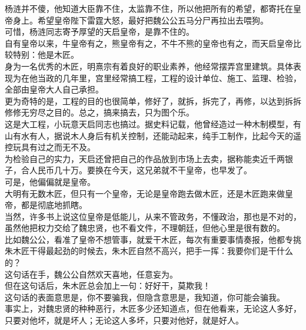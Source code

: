 \begin{multicols}{\theparacolNo}
杨涟并不傻，他知道大臣靠不住，太监靠不住，所以他把所有的希望，都寄托在皇帝身上。希望皇帝陛下雷霆大怒，最好把魏公公五马分尸再拉出去喂狗。\\

可惜，杨涟同志寄予厚望的天启皇帝，是靠不住的。\\

自有皇帝以来，牛皇帝有之，熊皇帝有之，不牛不熊的皇帝也有之，而天启皇帝比较特别：他是木匠。\\

身为一名优秀的木匠，明熹宗有着良好的职业素养，他经常摆弄宫里建筑。具体表现为在他当政的几年里，宫里经常搞工程，工程的设计单位、施工、监理、检验，全部由皇帝大人自己承担。\\

更为奇特的是，工程的目的也很简单，修好了，就拆，拆完了，再修，以达到拆拆修修无穷尽之目的。总之，搞来搞去，只为图个乐。\\

这是大工程，小玩意天启同志也搞过。据史料记载，他曾经造过一种木制模型，有山有水有人，据说木人身后有机关控制，还能动起来，纯手工制作，比起今天的遥控玩具有过之而无不及。\\

为检验自己的实力，天启还曾把自己的作品放到市场上去卖，据称能卖近千两银子，合人民币几十万。要换在今天，这兄弟就不干皇帝，也早发了。\\

可是，他偏偏就是皇帝。\\

大明有无数木匠，但只有一个皇帝，无论是皇帝跑去做木匠，还是木匠跑来做皇帝，都是彻底地抓瞎。\\

当然，许多书上说这位皇帝是低能儿，从来不管政务，不懂政治，那也是不对的，虽然他把权力交给了魏忠贤，也不看文件，不理朝廷，但他心里是很有数的。\\

比如魏公公，看准了皇帝不想管事，就爱干木匠，每次有重要事情奏报，他都专挑朱木匠干得最起劲的时候去，朱木匠自然不高兴，把手一挥：我要你们是干什么的？\\

这句话在手，魏公公自然欢天喜地，任意妄为。\\

但在这句话后，朱木匠总会加上一句：好好干，莫欺我！\\

这句话的表面意思是，你不要骗我，但隐含意思是，我知道，你可能会骗我。\\

事实上，对魏忠贤的种种恶行，木匠多少还知道点，但在他看来，无论这人多好，只要对他坏，就是坏人；无论这人多坏，只要对他好，就是好人。\\


\end{multicols}
